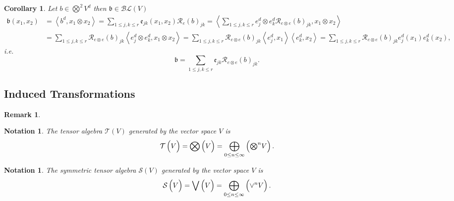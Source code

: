 \documentclass[aps,preprint]{revtex4}%
\newtheorem{corollary}[theorem]{Corollary}
\newtheorem{notation}[theorem]{Notation}
\newtheorem{remark}[theorem]{Remark}
\begin{document}
\begin{corollary}
Let $b\in%
{\textstyle\bigotimes\nolimits^{2}}
V^{d}$ then $\mathfrak{b\in}\mathcal{BL}\left(  V\right)  $
\begin{align}
\mathfrak{b}\left(  x_{1},x_{2}\right)   &  =\left\langle b^{d},x_{1}\otimes
x_{2}\right\rangle =\sum_{1\leq j,k\leq r}\mathfrak{e}_{jk}\left(  x_{1}%
,x_{2}\right)  \mathcal{R}_{e}\left(  b\right)  _{jk}=\left\langle \sum_{1\leq
j,k\leq r}e_{j}^{d}\otimes e_{k}^{d}\mathcal{R}_{e\otimes e}\left(  b\right)
_{jk},x_{1}\otimes x_{2}\right\rangle \\
&  =\sum_{1\leq j,k\leq r}\mathcal{R}_{e\otimes e}\left(  b\right)
_{jk}\left\langle e_{j}^{d}\otimes e_{k}^{d},x_{1}\otimes x_{2}\right\rangle
=\sum_{1\leq j,k\leq r}\mathcal{R}_{e\otimes e}\left(  b\right)
_{jk}\left\langle e_{j}^{d},x_{1}\right\rangle \left\langle e_{k}^{d}%
,x_{2}\right\rangle =\sum_{1\leq j,k\leq r}\mathcal{R}_{e\otimes e}\left(
b\right)  _{jk}e_{j}^{d}\left(  x_{1}\right)  e_{k}^{d}\left(  x_{2}\right)  ,
\end{align}
i.e.%
\begin{equation}
\mathfrak{b=}\sum_{1\leq j,k\leq r}\mathfrak{e}_{jk}\mathcal{R}_{e\otimes
e}\left(  b\right)  _{jk}.
\end{equation}

\end{corollary}

\subsection{Induced Transformations}

\begin{remark}
\label{Induced Transformations}
\end{remark}

\begin{notation}
The \emph{tensor algebra} $\mathcal{T}\left(  V\right)  $ generated by the
vector space $V$ is
\begin{equation}
\mathcal{T}\left(  \overset{}{V}\right)  =\bigotimes\left(  \overset{}{V}%
\right)  =\bigoplus\limits_{0\leq n\leq\infty}\left(  \overset{}{%
{\textstyle\bigotimes\nolimits^{n}}
V}\right)  .
\end{equation}

\end{notation}

\begin{notation}
The s\emph{ymmetric tensor algebra} $\mathcal{S}\left(  V\right)  $ generated
by the vector space $V$ is
\begin{equation}
\mathcal{S}\left(  \overset{}{V}\right)  =\bigvee\left(  \overset{}{V}\right)
=\bigoplus\limits_{0\leq n\leq\infty}\left(  \overset{}{{\Huge \vee}^{n}%
V}\right)  .
\end{equation}

\end{notation}
\end{document}
